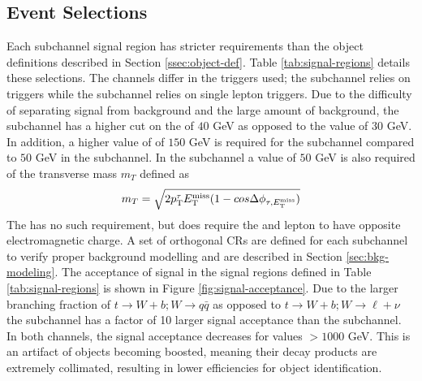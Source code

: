 		\subsection{Event Selections}\label{ssec:event-selection}
			Each subchannel signal region has stricter requirements than the object definitions described in Section \ref{ssec:object-def}. Table \ref{tab:signal-regions} details these selections. The channels differ in the triggers used; the \taujets subchannel relies on \Etm triggers while the \taulep subchannel relies on single lepton triggers. Due to the difficulty of separating signal from background and the large amount of background, the \taujets subchannel has a higher \pt cut on the \tauhad of $40$ GeV as opposed to the \taulep value of $30$ GeV. In addition, a higher value of \Etm of $150$ GeV is required for the \taujets subchannel compared to $50$ GeV in the \taulep subchannel. In the \taujets subchannel a value of $50$ GeV is also required of the transverse mass $m_{T}$ defined as 
			\begin{equation}\label{eqn:transverse-mass}
			m_{T} = \sqrt{ 2 p_{\text{T}}^{\tau} E_\text{T}^\text{miss} (1 - cos \Delta \phi_{\tau,E_\text{T}^\text{miss}}) }
			\end{equation}
			The \taulep has no such requirement, but does require the \tauhad and lepton to have opposite electromagnetic charge. A set of orthogonal \glspl{CR} are defined for each subchannel to verify proper background modelling and are described in Section \ref{sec:bkg-modeling}. The acceptance of signal in the signal regions defined in Table \ref{tab:signal-regions} is shown in Figure \ref{fig:signal-acceptance}. Due to the larger branching fraction of $t \to W+b;  W \to q\bar{q}$ as opposed to $t \to W+b; W \to \ell + \nu$ the \taujets subchannel has a factor of 10 larger signal acceptance than the \taulep subchannel. In both channels, the signal acceptance decreases for \mHpm values $> 1000$ GeV. This is an artifact of objects becoming boosted, meaning their decay products are extremely collimated, resulting in lower efficiencies for object identification.

